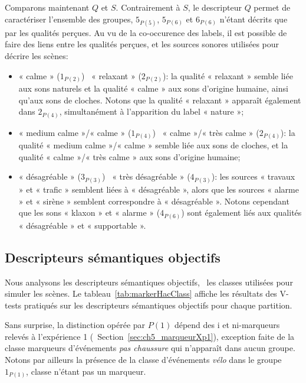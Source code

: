 Comparons maintenant $Q$ et $S$. Contrairement à $S$, le descripteur $Q$ permet de caractériser l'ensemble des groupes, $5_{P(5)}$, $5_{P(6)}$ et $6_{P(6)}$ n'étant décrits que par les qualités perçues. Au vu de la co-occurence des labels, il est possible de faire des liens entre les qualités perçues, et les sources sonores utilisées pour décrire les scènes:


\begin{itemize}
\item « calme » ($1_{P(2)}$) \vs~« relaxant » ($2_{P(2)}$): la qualité « relaxant » semble liée aux sons naturels et la qualité « calme » aux sons d'origine humaine, ainsi qu'aux sons de cloches. Notons que la qualité « relaxant » apparaît également dans $2_{P(4)}$, simultanément à l'apparition du label « nature »;
\item « medium calme »/« calme » ($1_{P(4)}$) \vs~« calme »/« très calme » ($2_{P(4)}$): la qualité « medium calme »/« calme » semble liée aux sons de cloches, et la qualité « calme »/« très calme » aux sons d'origine humaine;
\item « désagréable » ($3_{P(3)}$) \vs~« très désagréable » ($4_{P(3)}$): les sources « travaux » et « trafic » semblent liées à « désagréable », alors que les sources « alarme » et « sirène » semblent correspondre à « désagréable ». Notons cependant que les sons « klaxon » et « alarme » ($4_{P(6)}$) sont également liés aux qualités « désagréable » et « supportable ».
\end{itemize}

\subsection{Descripteurs sémantiques objectifs}

Nous analysons les descripteurs sémantiques objectifs, \ie~les classes utilisées pour simuler les scènes. Le tableau~\ref{tab:markerHacClass} affiche les résultats des V-tests pratiqués sur les descripteurs sémantiques objectifs pour chaque partition.

Sans surprise, la distinction opérée par $P(1)$ dépend des i et ni-marqueurs relevés à l'expérience 1 (\cf~Section~\ref{sec:ch5_marqueurXp1}), exception faite de la classe marqueurs d'événements \emph{pas chaussure} qui n'apparaît dans aucun groupe. Notons par ailleurs la présence de la classe d'événements \emph{vélo} dans le groupe $1_{P(1)}$, classe n'étant pas un marqueur.

